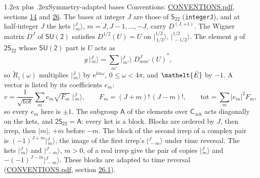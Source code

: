 \documentclass[10pt,a4paper]{article}
\makeatletter
\renewcommand\section{\@startsection{section}{1}{\z@}{-3ex plus -1ex minus -.2ex}%
  {1.2ex plus .2ex}{\normalfont\large\sffamily\bfseries\color{parttitle}}}
\numberwithin{equation}{section}
\newcommand{\eltfont}[1]{{\let\sigma\eltsigma\mathelt{#1}}}
\newcommand{\grp}[1]{\mathsf{#1}}
\newcommand{\elt}[1]{\eltfont{#1}}
\newcommand{\iunit}{\mathrm{i}}
\newcommand{\expe}{\mathrm{e}}
\newcommand{\irrJp}[2]{D^{(#1,#2)}}
\newcommand{\wignerD}[1]{D^{#1}}
\newcommand{\conj}[1]{{#1}^{*}}
\newcommand{\jm}[2]{\bigl\lvert{}^{#1}_{\,#2}\bigr\rangle}
\newcommand{\barred}[1]{\bar{#1}}
\newcommand{\lift}[1]{\tilde{#1}}
\makeatother
\begin{document}
\section{Symmetry-adapted bases}\label{s:bases}
Conventions: \href{../../CONVENTIONS.pdf}{CONVENTIONS.pdf}, sections \href{../../../rotation/CONVENTIONS.pdf\#conv.14}{14} and \href{../../CONVENTIONS.pdf\#conv.26}{26}.
\leavevmode\label{n:index.m}\label{n:vector.ket}The bases at integer $J$ are those of \href{../../../rotation/data/pdf/S22.pdf}{$\grp{S_{22}}$} (\texttt{integerJ}), and at half-integer $J$ the kets $\jm{J}{m}$, $m = J, J-1, \dots, -J$, carry $\irrJp{J}{+1}$. \label{n:matrix.wigner}The Wigner matrix $\wignerD{J}$ of $\grp{SU(2)}$ satisfies $\wignerD{1/2}(U) = U$ on $\jm{1/2}{1/2}$, $\jm{1/2}{-1/2}$. The element $g$ of $\grp{2S_{22}}$ whose $\grp{SU(2)}$ part is $U$ acts as
\begin{equation}\label{e:action}g\,\jm{J}{m} = \sum_{m'} \jm{J}{m'}\; \conj{\wignerD{J}_{m m'}(U)},\end{equation}
so $\lift{R}_{z}(\omega)$ multiplies $\jm{J}{m}$ by $\expe^{\iunit m\omega}$, $0 \le \omega < 4\pi$, and $\elt{\barred{E}}$ by $-1$. \label{n:index.ketcoefficient}\label{n:vector.basis.symmetry}\label{n:index.ketweight}\label{n:index.total}A vector is listed by its coefficients $e_m$:
\begin{equation}\label{e:ket}v = \frac{1}{\sqrt{\mathrm{tot}}}\sum_m e_m\sqrt{F_m}\;\jm{J}{m},\qquad F_m = (J+m)!\,(J-m)!,\qquad \mathrm{tot} = \sum_m |e_m|^2F_m,\end{equation}
so every $e_m$ here is $\pm 1$.
\leavevmode\label{n:group.A}The subgroup $\grp{A}$ of the elements over $\grp{C_{\infty h}}$ acts diagonally on the kets, and $\grp{2S_{22}} = \grp{A}$: every ket is a block. Blocks are ordered by $J$, then irrep, then $|m|$, $+m$ before $-m$. The block of the second irrep of a complex pair is $(-1)^{J+m}\jm{J}{m}$, the image of the first irrep's $\jm{J}{-m}$ under time reversal. The kets $\jm{J}{m}$ and $\jm{J}{-m}$, $m > 0$, of a real irrep give the pair of copies $\jm{J}{m}$ and $-(-1)^{J-m}\jm{J}{-m}$. These blocks are adapted to time reversal (\href{../../CONVENTIONS.pdf}{CONVENTIONS.pdf}, section \href{../../CONVENTIONS.pdf\#conv.26.1}{26.1}).
\end{document}
